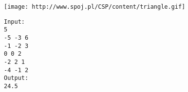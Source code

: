 \texttt{[image: http://www.spoj.pl/CSP/content/triangle.gif]}
\begin{verbatim}
Input:
5
-5 -3 6
-1 -2 3
0 0 2
-2 2 1
-4 -1 2
Output:
24.5
\end{verbatim}